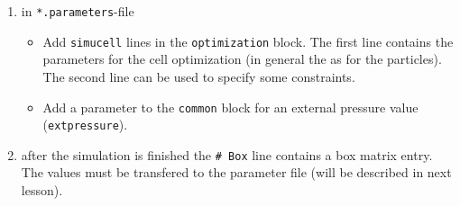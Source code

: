 \documentclass[11pt]{article}
\begin{document}
\begin{enumerate}
\item in \texttt{*.parameters}-file

\begin{itemize}
\item Add \texttt{simucell} lines in the \texttt{optimization} block. The first line contains the parameters for the cell optimization (in general the as for the particles). The second line can be used to specify some constraints.
\item Add a parameter to the \texttt{common} block for an external pressure value (\texttt{extpressure}).
\end{itemize}

\item after the simulation is finished the \texttt{\# Box} line contains a box matrix entry. The values must be transfered to the parameter file (will be described in next lesson).
\end{enumerate}
\end{document}
